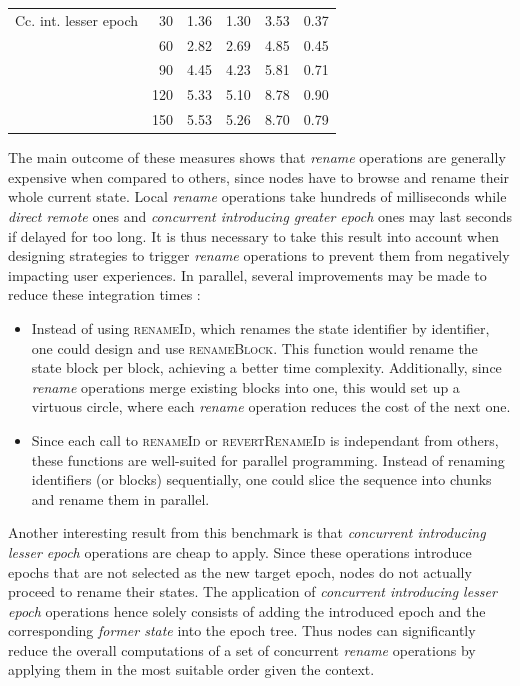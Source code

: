 \documentclass[10pt,journal,compsoc]{IEEEtran}
\begin{document}
\begin{table}[!ht]
{\begin{tabular}{lrrrrr}
            \cmidrule(lr){1-6}
            Cc. int. lesser epoch & 30  &     1.36 &     1.30 &       3.53 &   0.37 \\
                                    & 60  &     2.82 &     2.69 &       4.85 &   0.45 \\
                                    & 90  &     4.45 &     4.23 &       5.81 &   0.71 \\
                                    & 120 &     5.33 &     5.10 &       8.78 &   0.90 \\
                                    & 150 &     5.53 &     5.26 &       8.70 &   0.79 \\
            \bottomrule
        \end{tabular}
    }
\end{table}

The main outcome of these measures shows that \emph{rename} operations are generally expensive when compared to others, since nodes have to browse and rename their whole current state.
Local \emph{rename} operations take hundreds of milliseconds while \emph{direct remote} ones and \emph{concurrent introducing greater epoch} ones may last seconds if delayed for too long.
It is thus necessary to take this result into account when designing strategies to trigger \emph{rename} operations to prevent them from negatively impacting user experiences.
In parallel, several improvements may be made to reduce these integration times :
\begin{itemize}
    \item Instead of using \textsc{renameId}, which renames the state identifier by identifier, one could design and use \textsc{renameBlock}.
        This function would rename the state block per block, achieving a better time complexity.
        Additionally, since \emph{rename} operations merge existing blocks into one, this would set up a virtuous circle, where each \emph{rename} operation reduces the cost of the next one.
    \item Since each call to \textsc{renameId} or \textsc{revertRenameId} is independant from others, these functions are well-suited for parallel programming.
        Instead of renaming identifiers (or blocks) sequentially, one could slice the sequence into chunks and rename them in parallel.
\end{itemize}

Another interesting result from this benchmark is that \emph{concurrent introducing lesser epoch} operations are cheap to apply.
Since these operations introduce epochs that are not selected as the new target epoch, nodes do not actually proceed to rename their states.
The application of \emph{concurrent introducing lesser epoch} operations hence solely consists of adding the introduced epoch and the corresponding \emph{former state} into the epoch tree.
Thus nodes can significantly reduce the overall computations of a set of concurrent \emph{rename} operations by applying them in the most suitable order given the context.
\end{document}
